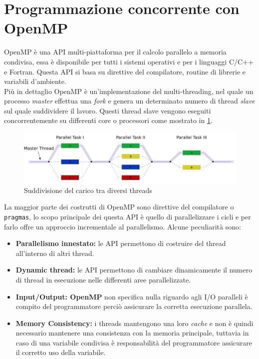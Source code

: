 \section{Programmazione concorrente con OpenMP}\label{capitolo4}
OpenMP è una API multi-piattaforma per il calcolo parallelo a memoria condivisa, essa è disponibile per tutti i sistemi operativi e per i linguaggi C/C++ e Fortran. Questa API si basa su direttive del compilatore, routine di librerie e variabili d'ambiente.\\
Più in dettaglio OpenMP è un'implementazione del multi-threading, nel quale un processo \emph{master} effettua una \emph{fork} e genera un determinato numero di thread \emph{slave} sul quale suddividere il lavoro. Questi thread slave vengono eseguiti concorrentemente su differenti core o processori come mostrato in \ref{fig:openmp}.\\
\begin{figure}
\centering
\includegraphics[width=0.7\linewidth]{img/openmp}
\caption{Suddivisione del carico tra diversi threads}
\label{fig:openmp}
\end{figure}
La maggior parte dei costrutti di OpenMP sono direttive del compilatore o \texttt{pragmas}, lo scopo principale dei questa API è quello di parallelizzare i cicli e per farlo offre un approccio incrementale al parallelismo.
Alcune peculiarità sono:
\begin{itemize}
	\item \textbf{Parallelismo innestato:} le API permettono di costruire del thread all'interno di altri thread.
	\item \textbf{Dynamic thread:} le API permettono di cambiare dinamicamente il numero di thread in esecuzione nelle differenti aree parallelizzate.
	\item \textbf{Input/Output: OpenMP} non specifica nulla riguardo agli I/O paralleli è compito del programmatore perciò assicurare la corretta esecuzione parallela.
	\item \textbf{Memory Consistency:} i threads mantengono una loro \emph{cache} e non è quindi necessario mantenere una consistenza con la memoria principale, tuttavia in caso di una variabile condivisa è responsabilità del programmatore assicurare il corretto uso della variabile.
\end{itemize}
